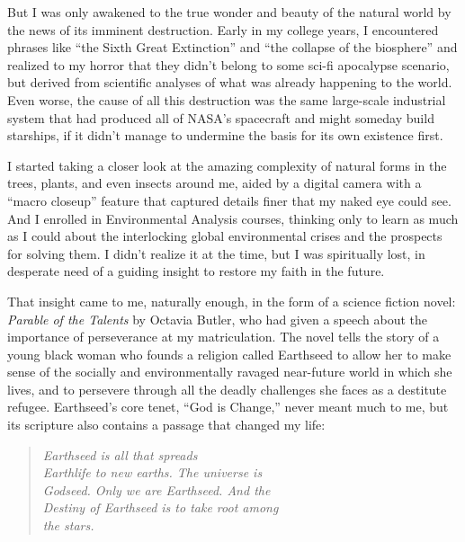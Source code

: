 \documentclass[ebook,12pt,openany,twoside]{memoir}
\begin{document}
But I was only awakened to the true wonder and beauty of the natural world by the news of its imminent destruction.  Early in my college years, I encountered phrases like ``the Sixth Great Extinction'' and ``the collapse of the biosphere'' and realized to my horror that they didn't belong to some sci-fi apocalypse scenario, but derived from scientific analyses of what was already happening to the world.  Even worse, the cause of all this destruction was the same large-scale industrial system that had produced all of NASA's spacecraft and might someday build starships, if it didn't manage to undermine the basis for its own existence first.

I started taking a closer look at the amazing complexity of natural forms in the trees, plants, and even insects around me, aided by a digital camera with a ``macro closeup'' feature that captured details finer that my naked eye could see.  And I enrolled in Environmental Analysis courses, thinking only to learn as much as I could about the interlocking global environmental crises and the prospects for solving them.  I didn't realize it at the time, but I was spiritually lost, in desperate need of a guiding insight to restore my faith in the future.

That insight came to me, naturally enough, in the form of a science fiction novel: {\em Parable of the Talents} by Octavia Butler, who had given a speech about the importance of perseverance at my matriculation.  The novel tells the story of a young black woman who founds a religion called Earthseed to allow her to make sense of the socially and environmentally ravaged near-future world in which she lives, and to persevere through all the deadly challenges she faces as a destitute refugee.  Earthseed's core tenet, ``God is Change,'' never meant much to me, but its scripture also contains a passage that changed my life:

\begin{verse}
\em
Earthseed is all that spreads\\
Earthlife to new earths.  The universe is\\
Godseed.  Only we are Earthseed.  And the\\
Destiny of Earthseed is to take root among\\
the stars.
\end{verse}
\end{document}
